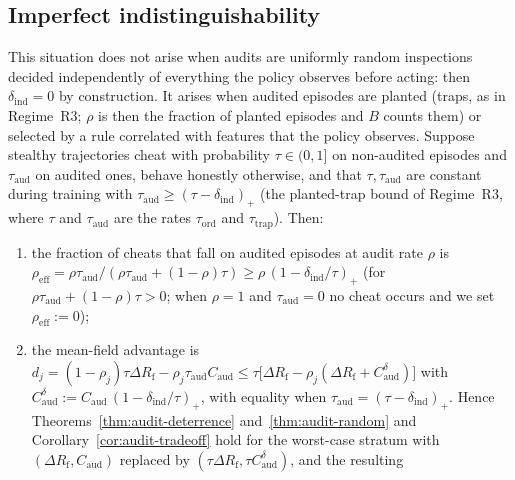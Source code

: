 \subsection{Imperfect indistinguishability}

\begin{proposition}
\label{prop:audit-indist}
This situation does not arise when audits are uniformly random inspections decided independently of everything the policy observes before acting: then $\delta_{\mathrm{ind}}=0$ by construction. It arises when audited episodes are planted (traps, as in Regime~R3; $\rho$ is then the fraction of planted episodes and $B$ counts them) or selected by a rule correlated with features that the policy observes.
Suppose stealthy trajectories cheat with probability $\tau\in(0,1]$ on
non-audited episodes and $\tau_{\mathrm{aud}}$ on audited ones, behave honestly otherwise,
and that $\tau,\tau_{\mathrm{aud}}$ are constant during training with
$\tau_{\mathrm{aud}}\ge(\tau-\delta_{\mathrm{ind}})_+$ (the planted-trap bound of Regime~R3, where $\tau$ and $\tau_{\mathrm{aud}}$ are the rates $\tau_{\mathrm{ord}}$ and $\tau_{\mathrm{trap}}$). Then:
\begin{enumerate}
\item[\textup{(a)}] the fraction of cheats that fall on audited episodes at
audit rate $\rho$ is
$\rho_{\mathrm{eff}}=\rho\tau_{\mathrm{aud}}/(\rho\tau_{\mathrm{aud}}+(1-\rho)\tau)\ge\rho\,(1-\delta_{\mathrm{ind}}/\tau)_+$ (for $\rho\tau_{\mathrm{aud}}+(1-\rho)\tau>0$; when $\rho=1$ and $\tau_{\mathrm{aud}}=0$ no cheat occurs and we set $\rho_{\mathrm{eff}}:=0$);
\item[\textup{(b)}] the mean-field advantage is
$d_j=(1-\rho_j)\tau\Delta R_{\mathrm f}-\rho_j\tau_{\mathrm{aud}}C_{\mathrm{aud}}\le\tau\bigl[\Delta R_{\mathrm f}-\rho_j(\Delta R_{\mathrm f}+C_{\mathrm{aud}}^{\delta})\bigr]$
with $C_{\mathrm{aud}}^{\delta}:=C_{\mathrm{aud}}\,(1-\delta_{\mathrm{ind}}/\tau)_+$, with equality when
$\tau_{\mathrm{aud}}=(\tau-\delta_{\mathrm{ind}})_+$. Hence
Theorems~\ref{thm:audit-deterrence} and~\ref{thm:audit-random} and
Corollary~\ref{cor:audit-tradeoff} hold for the worst-case stratum with
$(\Delta R_{\mathrm f},C_{\mathrm{aud}})$ replaced by $(\tau\Delta R_{\mathrm f},\tau C_{\mathrm{aud}}^{\delta})$, and the resulting

\end{enumerate}
\end{proposition}
